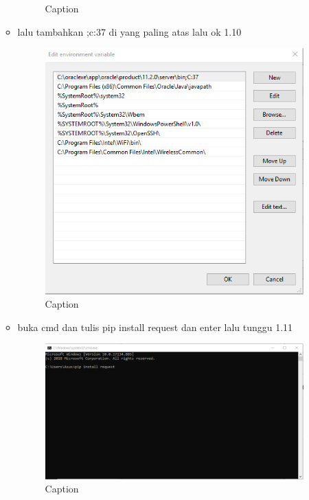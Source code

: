 \begin{enumerate}
\begin{itemize}
\begin{figure}
        \caption{Caption}
        \label{fig:my_label}
    \end{figure}
        \item lalu tambahkan ;c:37 di yang paling atas lalu ok 1.10
         \begin{figure}
    \centering
    \includegraphics[scale=0.5]{figures/8.PNG}
        \caption{Caption}
        \label{fig:my_label}
    \end{figure}
        \item buka cmd dan tulis pip install request dan enter lalu tunggu 1.11 
         \begin{figure}
    \centering
    \includegraphics[scale=0.5]{figures/9.PNG}
        \caption{Caption}
        \label{fig:my_label}
    \end{figure}

\end{itemize}
\end{enumerate}
